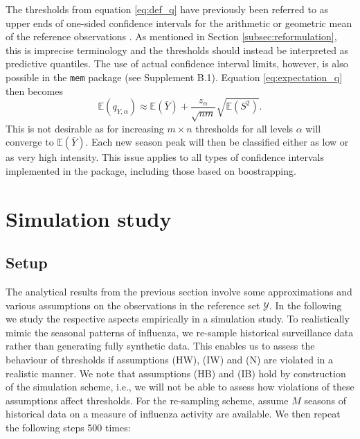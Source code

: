 \documentclass[12pt]{article}
\begin{document}
The thresholds from equation \eqref{eq:def_q} have previously been referred to as upper ends of one-sided confidence intervals for the arithmetic or geometric mean of the reference observations \citep{WHO2014, Vega2015}. As mentioned in Section \ref{subsec:reformulation}, this is imprecise terminology and the thresholds should instead be interpreted as predictive quantiles. The use of actual confidence interval limits, however, is also possible in the \texttt{mem} package (see Supplement B.1). Equation \eqref{eq:expectation_q} then becomes
$$
\mathbb{E}(q_{Y, \alpha}) \approx \mathbb{E}(\bar{Y}) + \frac{z_\alpha}{\sqrt{nm}} \sqrt{\mathbb{E}(S^2)}.
$$
This is not desirable as for increasing $m \times n$ thresholds for all levels $\alpha$ will converge to $\mathbb{E}(\bar{Y})$. Each new season peak will then be classified either as low or as very high intensity. This issue applies to all types of confidence intervals implemented in the package, including those based on boostrapping.

\section{Simulation study}
\label{sec:simulation}

\subsection{Setup}
\label{subsec:simulation_setup}

The analytical results from the previous section involve some approximations and various assumptions on the observations in the reference set $\mathcal{Y}$. In the following we study the respective aspects empirically in a simulation study. To realistically mimic the seasonal patterns of influenza, we re-sample historical surveillance data rather than generating fully synthetic data. This enables us to assess the behaviour of thresholds if assumptions (HW), (IW) and (N) are violated in a realistic manner. We note that assumptions (HB) and (IB) hold by construction of the simulation scheme, i.e., we will not be able to assess how violations of these assumptions affect thresholds. For the re-sampling scheme, assume $M$ seasons of historical data on a measure of influenza activity are available. We then repeat the following steps 500 times:
\end{document}
